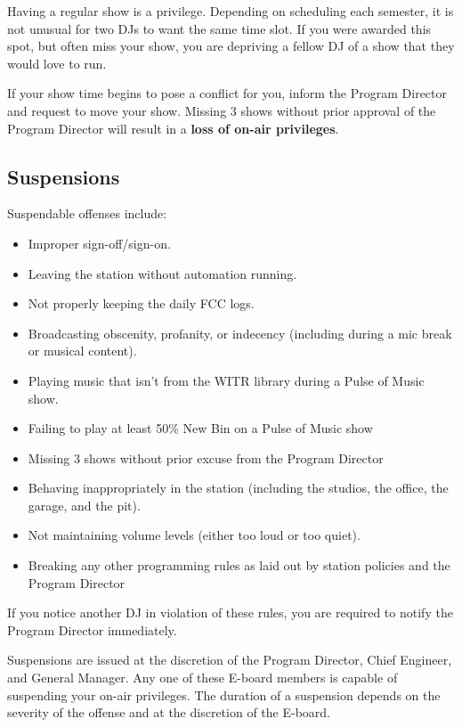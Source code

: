 \documentclass{witrman}
\begin{document}
Having a regular show is a privilege.  Depending on scheduling each semester, it
is not unusual for two DJs to want the same time slot.  If you were awarded this
spot, but often miss your show, you are depriving a fellow DJ of a show that
they would love to run.

If your show time begins to pose a conflict for you, inform the Program Director
and request to move your show.  Missing 3 shows without prior approval of the
Program Director will result in a \textbf{loss of on-air privileges}.


\subsection{Suspensions}

Suspendable offenses include:

\begin{itemize}
    \item Improper sign-off/sign-on.
    \item Leaving the station without automation running. 
    \item Not properly keeping the daily FCC logs.
    \item Broadcasting obscenity, profanity, or indecency (including during a
        mic break or musical content).
    \item Playing music that isn't from the WITR library during a Pulse of Music
        show.
    \item Failing to play at least 50\% New Bin on a Pulse of Music show
    \item Missing 3 shows without prior excuse from the Program Director
    \item Behaving inappropriately in the station (including the studios, the
        office, the garage, and the pit).
    \item Not maintaining volume levels (either too loud or too quiet).
    \item Breaking any other programming rules as laid out by station policies
        and the Program Director
\end{itemize}

If you notice another DJ in violation of these rules, you are required to notify
the Program Director immediately.

Suspensions are issued at the discretion of the Program Director, Chief
Engineer, and General Manager.  Any one of these E-board members is capable of
suspending your on-air privileges.  The duration of a suspension depends on the
severity of the offense and at the discretion of the E-board.
\end{document}
